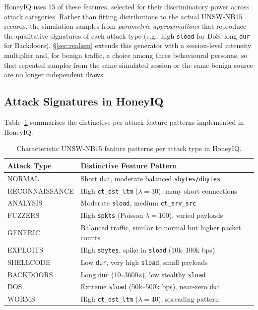 HoneyIQ uses 15 of these features, selected for their discriminatory power
across attack categories.
Rather than fitting distributions to the actual UNSW-NB15 records, the
simulation samples from \emph{parametric approximations} that reproduce the
qualitative signatures of each attack type (e.g., high \texttt{sload} for
DoS, long \texttt{dur} for Backdoors).
\S\ref{sec:realism} extends this generator with a session-level intensity
multiplier and, for benign traffic, a choice among three behavioural
personas, so that repeated samples from the same simulated session or the
same benign source are no longer independent draws.

\subsection{Attack Signatures in HoneyIQ}

Table~\ref{tab:feature_signatures} summarises the distinctive per-attack
feature patterns implemented in HoneyIQ.

\begin{table}[ht]
  \centering
  \caption{Characteristic UNSW-NB15 feature patterns per attack type in HoneyIQ.}
  \label{tab:feature_signatures}
  \begin{tabular}{lll}
    \toprule
    Attack Type & Distinctive Feature Pattern \\
    \midrule
    NORMAL         & Short \texttt{dur}, moderate balanced \texttt{sbytes/dbytes} \\
    RECONNAISSANCE & High \texttt{ct\_dst\_ltm} ($\lambda=30$), many short connections \\
    ANALYSIS       & Moderate \texttt{sload}, medium \texttt{ct\_srv\_src} \\
    FUZZERS        & High \texttt{spkts} (Poisson $\lambda=100$), varied payloads \\
    GENERIC        & Balanced traffic, similar to normal but higher packet counts \\
    EXPLOITS       & High \texttt{sbytes}, spike in \texttt{sload} (10k--100k bps) \\
    SHELLCODE      & Low \texttt{dur}, very high \texttt{sload}, small payloads \\
    BACKDOORS      & Long \texttt{dur} (10--3600\,s), low stealthy \texttt{sload} \\
    DOS            & Extreme \texttt{sload} (50k--500k bps), near-zero \texttt{dur} \\
    WORMS          & High \texttt{ct\_dst\_ltm} ($\lambda=40$), spreading pattern \\
    \bottomrule
  \end{tabular}
\end{table}

